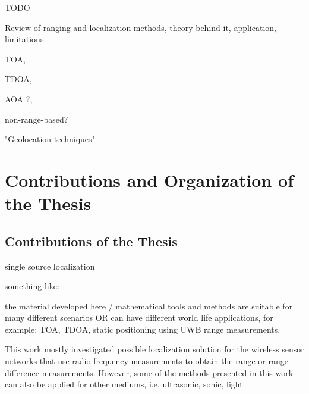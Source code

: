TODO

Review of ranging and localization methods, theory behind it, application, limitations. 

TOA,
 
TDOA,

AOA ?,

non-range-based? 

"Geolocation techniques"

\cite{GeoLoc}
\cite{LiuSurvey}


\section{Contributions and Organization of the Thesis}

\subsection{Contributions  of the Thesis} \label{contributions}
single source localization

something like:

the material developed here / mathematical tools and methods are suitable for many different scenarios 
OR
can have different world life applications, for example: TOA, TDOA, static positioning using UWB range measurements. 

This work mostly investigated possible localization solution for the wireless sensor networks that use radio frequency measurements to obtain the range or range-difference measurements. However, some of the methods presented in this work can also be applied for other mediums, i.e. ultrasonic, sonic, light. 

